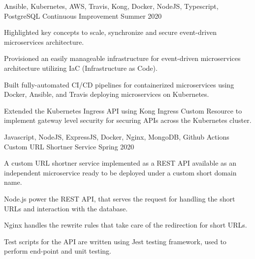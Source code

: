 \begin{cventries}
  \cventry
    {Ansible, Kubernetes, AWS, Travis, Kong, Docker, NodeJS, Typescript, PostgreSQL} %
    {Continuous Improvement} %
    {} %
    {Summer 2020} %
    {
      \begin{cvitems} %
        \item {Highlighted key concepts to scale, synchronize and secure event-driven microservices architecture.}
        \item {Provisioned an easily manageable infrastructure for event-driven microservices architecture utilizing IaC (Infrastructure as Code).}
        \item {Built fully-automated CI/CD pipelines for containerized microservices using Docker, Ansible, and Travis deploying microservices on Kubernetes.}
        \item {Extended the Kubernetes Ingress API using Kong Ingress Custom Resource to implement gateway level security for securing APIs across the Kubernetes cluster.}
      \end{cvitems}
    }

  \cventry
    {Javascript, NodeJS, ExpressJS, Docker, Nginx, MongoDB, Github Actions} %
    {Custom URL Shortner Service} %
    {} %
    {Spring 2020} %
    {
      \begin{cvitems} %
        \item {A custom URL shortner service implemented as a REST API available as an independent microservice ready to be deployed under a custom short domain name.}
        \item {Node.js power the REST API, that serves the request for handling the short URLs and interaction with the database.}
        \item {Nginx handles the rewrite rules that take care of the redirection for short URLs.}
        \item {Test scripts for the API are written using Jest testing framework, used to perform end-point and unit testing.}
      \end{cvitems}
    }


\end{cventries}

